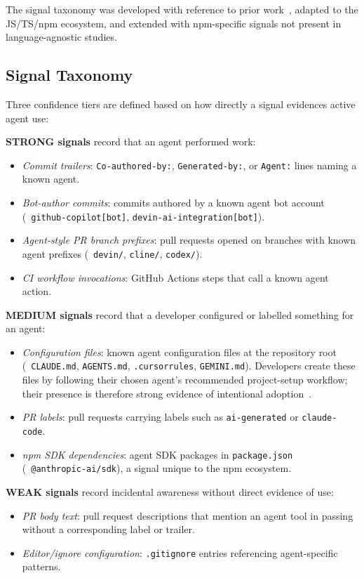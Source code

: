 The signal taxonomy was developed with reference to prior work~\cite{robbesHeuristics2026, galsterConfig2026, ghaleb2026, khosravani2026}, adapted to the JS/TS/npm ecosystem, and extended with npm-specific signals not present in language-agnostic studies.

\subsection{Signal Taxonomy}

Three confidence tiers are defined based on how directly a signal evidences active agent use:

\textbf{STRONG signals} record that an agent performed work:
\begin{itemize}
  \item \emph{Commit trailers}: \texttt{Co-authored-by:}, \texttt{Generated-by:}, or \texttt{Agent:} lines naming a known agent.
  \item \emph{Bot-author commits}: commits authored by a known agent bot account (\eg\ \texttt{github-copilot[bot]}, \texttt{devin-ai-integration[bot]}).
  \item \emph{Agent-style PR branch prefixes}: pull requests opened on branches with known agent prefixes (\eg\ \texttt{devin/}, \texttt{cline/}, \texttt{codex/}).
  \item \emph{CI workflow invocations}: GitHub Actions steps that call a known agent action.
\end{itemize}

\textbf{MEDIUM signals} record that a developer configured or labelled something for an agent:
\begin{itemize}
  \item \emph{Configuration files}: known agent configuration files at the repository root (\eg\ \texttt{CLAUDE.md}, \texttt{AGENTS.md}, \texttt{.cursorrules}, \texttt{GEMINI.md}). Developers create these files by following their chosen agent's recommended project-setup workflow; their presence is therefore strong evidence of intentional adoption~\cite{galsterConfig2026}.
  \item \emph{PR labels}: pull requests carrying labels such as \texttt{ai-generated} or \texttt{claude-code}.
  \item \emph{npm SDK dependencies}: agent SDK packages in \texttt{package.json} (\eg\ \texttt{@anthropic-ai/sdk}), a signal unique to the npm ecosystem.
\end{itemize}

\textbf{WEAK signals} record incidental awareness without direct evidence of use:
\begin{itemize}
  \item \emph{PR body text}: pull request descriptions that mention an agent tool in passing without a corresponding label or trailer.
  \item \emph{Editor/ignore configuration}: \texttt{.gitignore} entries referencing agent-specific patterns.
\end{itemize}

